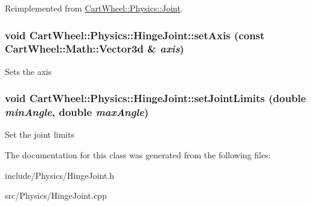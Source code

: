 Reimplemented from \hyperlink{classCartWheel_1_1Physics_1_1Joint_a3a70bb2e447b5acd7997545d3751a423}{CartWheel::Physics::Joint}.

\hypertarget{classCartWheel_1_1Physics_1_1HingeJoint_ad1f3776125f03d67f5abbc90453d28ce}{
\subsubsection[{setAxis}]{\setlength{\rightskip}{0pt plus 5cm}void CartWheel::Physics::HingeJoint::setAxis (const {\bf CartWheel::Math::Vector3d} \& {\em axis})}}
\label{classCartWheel_1_1Physics_1_1HingeJoint_ad1f3776125f03d67f5abbc90453d28ce}
Sets the axis \hypertarget{classCartWheel_1_1Physics_1_1HingeJoint_a2d54017b1dcff97409aae453f0b3ab58}{
\subsubsection[{setJointLimits}]{\setlength{\rightskip}{0pt plus 5cm}void CartWheel::Physics::HingeJoint::setJointLimits (double {\em minAngle}, \/  double {\em maxAngle})}}
\label{classCartWheel_1_1Physics_1_1HingeJoint_a2d54017b1dcff97409aae453f0b3ab58}
Set the joint limits 

The documentation for this class was generated from the following files:\begin{DoxyCompactItemize}
\item 
include/Physics/HingeJoint.h\item 
src/Physics/HingeJoint.cpp\end{DoxyCompactItemize}

